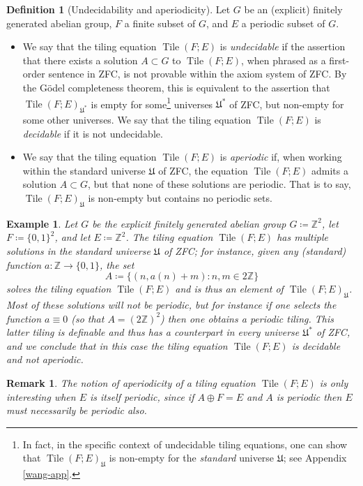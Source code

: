 \documentclass[reqno,a4paper,12pt]{amsart}
\numberwithin{equation}{section}
\numberwithin{figure}{section}
\def\Z{\mathbb{Z}}
\newcommand{\Tile}{\operatorname{Tile}}
\newcommand{\Universe}{{\mathfrak{U}}}
\theoremstyle{plain}
\newtheorem{remark}[thm]{Remark}
\newtheorem{example}[thm]{Example}
\theoremstyle{definition}
\newtheorem{definition}[thm]{Definition}
\begin{document}
\begin{definition}[Undecidability and aperiodicity]\label{undecide}  Let $G$ be an (explicit) finitely generated abelian group, $F$ a finite subset of $G$, and $E$ a periodic subset of $G$.
\begin{itemize}
\item[(i)]  We say that the tiling equation $\Tile(F;E)$ is \emph{undecidable} if the assertion that there exists a solution $A \subset G$ to $\Tile(F;E)$, when phrased as a first-order sentence in ZFC, is not provable within the axiom system of ZFC.  By the G\"odel completeness theorem, this is equivalent to the assertion that $\Tile(F;E)_{\Universe^*}$ is empty for some\footnote{In fact, in the specific context of undecidable tiling equations, one can show that $\Tile(F;E)_{\Universe}$ is non-empty for the \emph{standard} universe $\Universe$; see Appendix \ref{wang-app}.} universes $\Universe^*$ of ZFC, but non-empty for some other universes.  We say that the tiling equation $\Tile(F;E)$ is \emph{decidable} if it is not undecidable.
\item[(ii)]  We say that the tiling equation $\Tile(F;E)$ is \emph{aperiodic} if, when working within the standard universe $\Universe$ of ZFC, the equation $\Tile(F;E)$ admits a solution $A \subset G$, but that none of these solutions are periodic.  That is to say, $\Tile(F;E)_\Universe$ is non-empty but contains no periodic sets.
\end{itemize}
\end{definition}

\begin{example}\label{simple-tile}  Let $G$ be the explicit finitely generated abelian group $G \coloneqq \Z^2$, let $F \coloneqq \{0,1\}^2$, and let $E \coloneqq \Z^2$.  The tiling equation $\Tile(F;E)$ has multiple solutions in the standard universe $\Universe$ of ZFC; for instance, given any (standard) function $a \colon \Z \to \{0,1\}$, the set
$$ A \coloneqq \{ (n, a(n) + m): n,m \in 2\Z \}$$
solves the tiling equation $\Tile(F;E)$ and is thus an element of $\Tile(F;E)_\Universe$.  Most of these solutions will not be periodic, but for instance if one selects the function $a \equiv 0$ (so that $A = (2\Z)^2$) then one obtains a periodic tiling.  This latter tiling is definable and thus has a counterpart in every universe $\Universe^*$ of ZFC, and we conclude that in this case the tiling equation $\Tile(F;E)$ is decidable and not aperiodic.
\end{example}

\begin{remark} The notion of aperiodicity of a tiling equation $\Tile(F;E)$ is only interesting when $E$ is itself periodic, since if $A \oplus F = E$ and $A$ is periodic then $E$ must necessarily be periodic also.
\end{remark}
\end{document}
